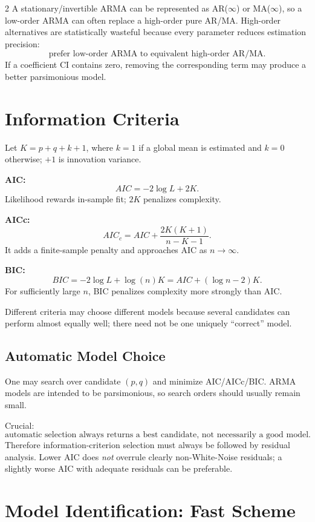 \documentclass[9pt,a4paper]{extarticle}
\newcommand{\key}[1]{\textbf{#1}}
\begin{document}
\begin{multicols}{2}
A stationary/invertible ARMA can be represented as AR($\infty$) or MA($\infty$), so a low-order ARMA can often replace a high-order pure AR/MA. High-order alternatives are statistically wasteful because every parameter reduces estimation precision:
\[
\boxed{\text{prefer low-order ARMA to equivalent high-order AR/MA}.}
\]
If a coefficient CI contains zero, removing the corresponding term may produce a better parsimonious model.

\section{Information Criteria}

Let \(K=p+q+k+1\), where \(k=1\) if a global mean is estimated and \(k=0\) otherwise; \(+1\) is innovation variance.

\key{AIC:}
\[
\boxed{AIC=-2\log L+2K}.
\]
Likelihood rewards in-sample fit; \(2K\) penalizes complexity.

\key{AICc:}
\[
\boxed{AIC_c=AIC+\frac{2K(K+1)}{n-K-1}}.
\]
It adds a finite-sample penalty and approaches AIC as \(n\to\infty\).

\key{BIC:}
\[
\boxed{BIC=-2\log L+\log(n)K
=AIC+(\log n-2)K.}
\]
For sufficiently large \(n\), BIC penalizes complexity more strongly than AIC.

Different criteria may choose different models because several candidates can perform almost equally well; there need not be one uniquely ``correct'' model.

\subsection{Automatic Model Choice}

One may search over candidate \((p,q)\) and minimize AIC/AICc/BIC. ARMA models are intended to be parsimonious, so search orders should usually remain small.

Crucial:
\[
\boxed{\text{automatic selection always returns a best candidate, not necessarily a good model}.}
\]
Therefore information-criterion selection must always be followed by residual analysis. Lower AIC does \emph{not} overrule clearly non-White-Noise residuals; a slightly worse AIC with adequate residuals can be preferable.

\section{Model Identification: Fast Scheme}


\end{multicols}
\end{document}
